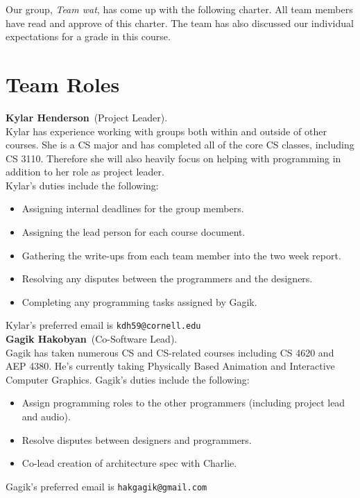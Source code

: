 \documentclass[letterpaper,11pt]{texMemo} %
\newcommand{\teamname}{Team wat}
\newcommand{\teammember}[2]{ \textbf{#1}\ (#2).\ }
\newenvironment{duties}[1]
               {
                 #1's duties include the following:
                 \begin{itemize}
               }
               {
                 \end{itemize}
               }
\newcommand{\preferredemail}[2]{#1's preferred email is \texttt{#2}\\}
\begin{document}
\maketitle %


Our group, \textit{\teamname}, has come up with the following charter.
All team members have read and approve of this charter. The team has also
discussed our individual expectations for a grade in this course.

\section*{Team Roles}

\teammember{Kylar Henderson}{Project Leader}\\Kylar has experience working with groups both within and outside of other courses. She is a CS major and has completed all of the core CS classes, including CS 3110. Therefore she will also heavily focus on helping with programming in addition to her role as project leader.\\
\begin{duties}{Kylar}
  \item Assigning internal deadlines for the group members.
  \item Assigning the lead person for each course document.
  \item Gathering the write-ups from each team member into the two week report. 
  \item Resolving any disputes between the programmers and the designers.
  \item Completing any programming tasks assigned by Gagik.
\end{duties}
\preferredemail{Kylar}{kdh59@cornell.edu}

\teammember{Gagik Hakobyan}{Co-Software Lead}\\Gagik has taken numerous CS and CS-related courses including CS 4620 and AEP 4380.  He’s currently taking Physically Based Animation and Interactive Computer Graphics.
\begin{duties}{Gagik}
\item Assign programming roles to the other programmers (including project lead and audio).
\item Resolve disputes between designers and programmers.
\item Co-lead creation of architecture spec with Charlie.
\end{duties}
\preferredemail{Gagik}{hakgagik@gmail.com}
\end{document}
